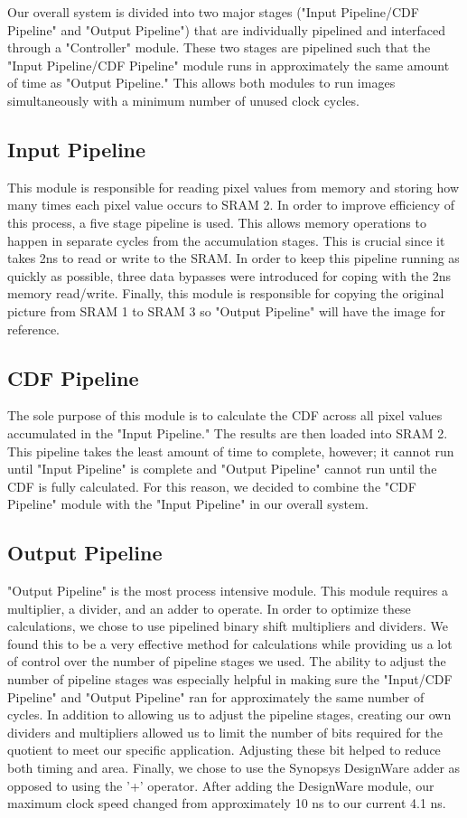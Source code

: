 \documentclass[10pt]{IEEEtran}
\begin{document}
Our overall system is divided into two major stages ("Input Pipeline/CDF Pipeline" and "Output Pipeline") that are individually pipelined and interfaced through a "Controller" module. These two stages are pipelined such that the "Input Pipeline/CDF Pipeline" module runs in approximately the same amount of time as "Output Pipeline." This allows both modules to run images simultaneously with a minimum number of unused clock cycles.

\subsection*{Input Pipeline}
This module is responsible for reading pixel values from memory and storing how many times each pixel value occurs to SRAM 2. In order to improve efficiency of this process, a five stage pipeline is used. This allows memory operations to happen in separate cycles from the accumulation stages. This is crucial since it takes 2ns to read or write to the SRAM. In order to keep this pipeline running as quickly as possible, three data bypasses were introduced for coping with the 2ns memory read/write. Finally, this module is responsible for copying the original picture from SRAM 1 to SRAM 3 so "Output Pipeline" will have the image for reference.

\subsection*{CDF Pipeline}
The sole purpose of this module is to calculate the CDF across all pixel values accumulated in the "Input Pipeline." The results are then loaded into SRAM 2. This pipeline takes the least amount of time to complete, however; it cannot run until "Input Pipeline" is complete and "Output Pipeline" cannot run until the CDF is fully calculated. For this reason, we decided to combine the "CDF Pipeline" module with the "Input Pipeline" in our overall system.

\subsection*{Output Pipeline}
"Output Pipeline" is the most process intensive module. This module requires a multiplier, a divider, and an adder to operate. In order to optimize these calculations, we chose to use pipelined binary shift multipliers and dividers. We found this to be a very effective method for calculations while providing us a lot of control over the number of pipeline stages we used. The ability to adjust the number of pipeline stages was especially helpful in making sure the "Input/CDF Pipeline" and "Output Pipeline" ran for approximately the same number of cycles. In addition to allowing us to adjust the pipeline stages, creating our own dividers and multipliers allowed us to limit the number of bits required for the quotient to meet our specific application. Adjusting these bit helped to reduce both timing and area. Finally, we chose to use the Synopsys DesignWare adder as opposed to using the '+' operator. After adding the DesignWare module, our maximum clock speed changed from approximately 10 ns to our current 4.1 ns.
 
\end{document}
